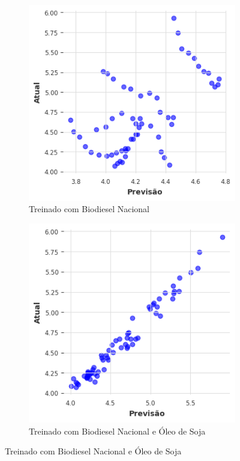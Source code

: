 \begin{figure}[htbp]
	\centering
	\begin{subfigure}[b]{0.40\textwidth}
		\centering
		\includegraphics[width=\textwidth]{figuras/narx_takens_brasil_scatter.png} %
		\caption{Treinado com Biodiesel Nacional \newline}
		\label{fig:narx_takens_brasil_scatter}
	\end{subfigure}
	\hfill
	\begin{subfigure}[b]{0.40\textwidth}
		\centering
		\includegraphics[width=\textwidth]{figuras/narx_takens_brasil_oil_scatter.png} %
		\caption{Treinado com Biodiesel Nacional e Óleo de Soja}
		\label{fig:narx_takens_brasil_oil_scatter}
	\end{subfigure}


\end{figure}
